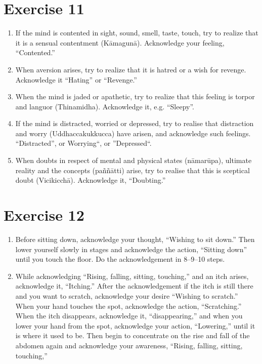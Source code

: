 \documentclass[a5paper,10pt,english]{book}
\begin{document}
\section{Exercise 11}
\label{\detokenize{practice:exercise-11}}\begin{enumerate}
%
\item {} 
\sphinxAtStartPar
If the mind is contented in sight, sound, smell, taste, touch, try to realize that it is a sensual contentment (Kāmagunā). Acknowledge your feeling, “Contented.”

\item {} 
\sphinxAtStartPar
When aversion arises, try to realize that it is hatred or a wish for revenge. Acknowledge it “Hating” or “Revenge.”

\item {} 
\sphinxAtStartPar
When the mind is jaded or apathetic, try to realize that this feeling is torpor and languor (Thinamidha). Acknowledge it, e.g. “Sleepy”.

\item {} 
\sphinxAtStartPar
If the mind is distracted, worried or depressed, try to realise that distraction and worry (Uddhaccakukkucca) have arisen, and acknowledge such feelings. “Distracted”, or Worrying“, or ”Depressed“.

\item {} 
\sphinxAtStartPar
When doubts in respect of mental and physical states (nāmarūpa), ultimate reality and the concepts (paññātti) arise, try to realise that this is sceptical doubt (Vicikicchā). Acknowledge it, “Doubting.”

\end{enumerate}


\section{Exercise 12}
\label{\detokenize{practice:exercise-12}}\begin{enumerate}
%
\item {} 
\sphinxAtStartPar
Before sitting down, acknowledge your thought, “Wishing to sit down.” Then lower yourself slowly in stages and acknowledge the action, “Sitting down” until you touch the floor. Do the acknowledgement in 8–9–10 steps.

\item {} 
\sphinxAtStartPar
While acknowledging “Rising, falling, sitting, touching,” and an itch arises, acknowledge it, “Itching.” After the acknowledgement if the itch is still there and you want to scratch, acknowledge your desire “Wishing to scratch.” When your hand touches the spot, acknowledge the action, “Scratching.” When the itch disappears, acknowledge it, “disappearing,” and when you lower your hand from the spot, acknowledge your action, “Lowering,” until it is where it used to be. Then begin to concentrate on the rise and fall of the abdomen again and acknowledge your awareness, “Rising, falling, sitting, touching,”

\end{enumerate}
\end{document}

